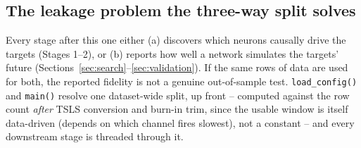 \documentclass[11pt]{article}
\begin{document}
\subsection{The leakage problem the three-way split solves}
\label{sec:leakage-problem}
Every stage after this one either (a) discovers which neurons causally drive the targets (Stages 1--2), or (b) reports how well a network simulates the targets' future (Sections~\ref{sec:search}--\ref{sec:validation}). If the same rows of data are used for both, the reported fidelity is not a genuine out-of-sample test. \texttt{load\_config()} and \texttt{main()} resolve one dataset-wide split, up front -- computed against the row count \emph{after} TSLS conversion and burn-in trim, since the usable window is itself data-driven (depends on which channel fires slowest), not a constant -- and every downstream stage is threaded through it.
\end{document}
